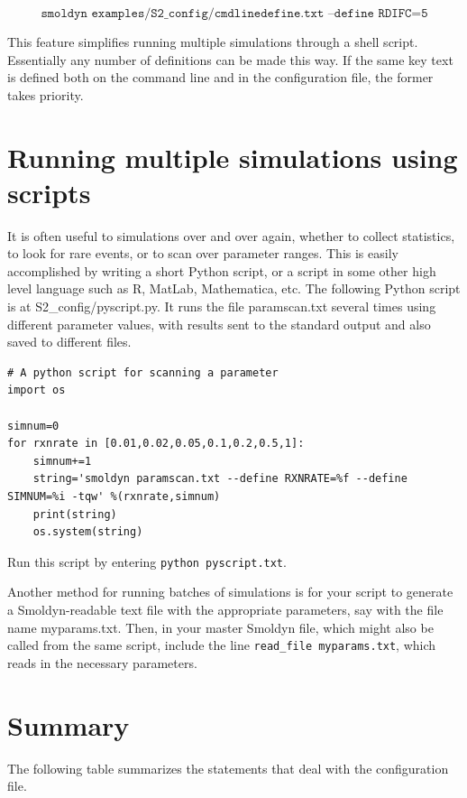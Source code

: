\documentclass {scrbook}
\newcommand {\ttt} {\texttt}
\begin{document}
$$\ttt{smoldyn examples/S2\_config/cmdlinedefine.txt --define RDIFC=5}$$

This feature simplifies running multiple simulations through a shell script. Essentially any number of definitions can be made this way. If the same key text is defined both on the command line and in the configuration file, the former takes priority.

\section{Running multiple simulations using scripts}

It is often useful to simulations over and over again, whether to collect statistics, to look for rare events, or to scan over parameter ranges. This is easily accomplished by writing a short Python script, or a script in some other high level language such as R, MatLab, Mathematica, etc. The following Python script is at S2\_config/pyscript.py. It runs the file paramscan.txt several times using different parameter values, with results sent to the standard output and also saved to different files.

\begin{lstlisting}[style=SSAPython]
# A python script for scanning a parameter
import os

simnum=0
for rxnrate in [0.01,0.02,0.05,0.1,0.2,0.5,1]:
	simnum+=1
	string='smoldyn paramscan.txt --define RXNRATE=%f --define SIMNUM=%i -tqw' %(rxnrate,simnum)
	print(string)
	os.system(string)
\end{lstlisting}
Run this script by entering \ttt{python pyscript.txt}.

Another method for running batches of simulations is for your script to generate a Smoldyn-readable text file with the appropriate parameters, say with the file name myparams.txt. Then, in your master Smoldyn file, which might also be called from the same script, include the line \ttt{read\_file myparams.txt}, which reads in the necessary parameters.

\section{Summary}

The following table summarizes the statements that deal with the configuration file.
\end{document}

